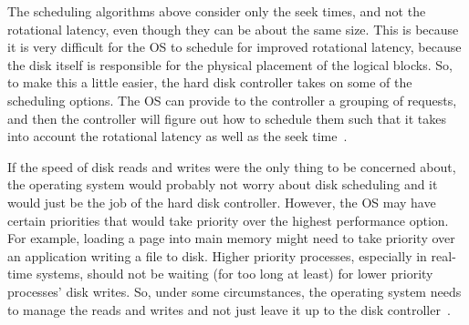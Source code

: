 The scheduling algorithms above consider only the seek times, and not the rotational latency, even though they can be about the same size. This is because it is very difficult for the OS to schedule for improved rotational latency, because the disk itself is responsible for the physical placement of the logical blocks. So, to make this a little easier, the hard disk controller takes on some of the scheduling options. The OS can provide to the controller a grouping of requests, and then the controller will figure out how to schedule them such that it takes into account the rotational latency as well as the seek time~\cite{osc}.

If the speed of disk reads and writes were the only thing to be concerned about, the operating system would probably not worry about disk scheduling and it would just be the job of the hard disk controller. However, the OS may have certain priorities that would take priority over the highest performance option. For example, loading a page into main memory might need to take priority over an application writing a file to disk. Higher priority processes, especially in real-time systems, should not be waiting (for too long at least) for lower priority processes' disk writes. So, under some circumstances, the operating system needs to manage the reads and writes and not just leave it up to the disk controller~\cite{osc}.




